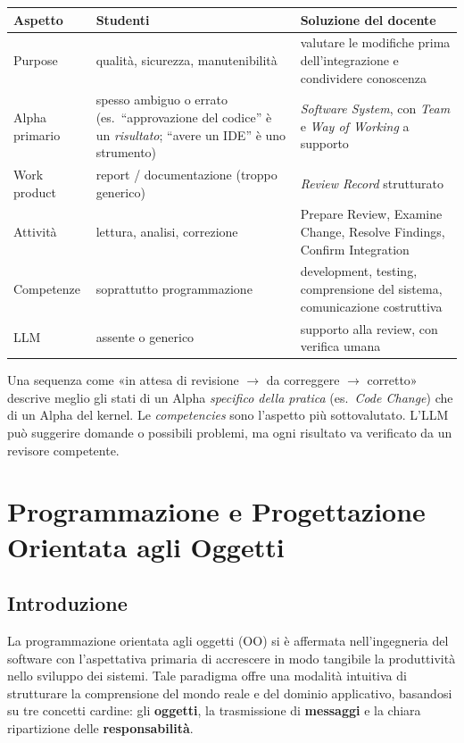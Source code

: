\documentclass[12pt]{extarticle}
\begin{document}
\begin{center}
\small
\begin{tabular}{p{2.4cm}p{4.6cm}p{7.6cm}}
    \toprule
    \textbf{Aspetto} & \textbf{Studenti} & \textbf{Soluzione del docente} \\
    \midrule
    Purpose & qualità, sicurezza, manutenibilità & valutare le modifiche prima dell'integrazione e condividere conoscenza \\
    Alpha primario & spesso ambiguo o errato (es.\ ``approvazione del codice'' è un \emph{risultato}; ``avere un IDE'' è uno strumento) & \textit{Software System}, con \textit{Team} e \textit{Way of Working} a supporto \\
    Work product & report / documentazione (troppo generico) & \textit{Review Record} strutturato \\
    Attività & lettura, analisi, correzione & Prepare Review, Examine Change, Resolve Findings, Confirm Integration \\
    Competenze & soprattutto programmazione & development, testing, comprensione del sistema, comunicazione costruttiva \\
    LLM & assente o generico & supporto alla review, con verifica umana \\
    \bottomrule
\end{tabular}
\end{center}
\noindent Una sequenza come «in attesa di revisione $\to$ da correggere $\to$ corretto» descrive meglio gli stati di un Alpha \emph{specifico della pratica} (es.\ \textit{Code Change}) che di un Alpha del kernel. Le \textit{competencies} sono l'aspetto più sottovalutato. L'LLM può suggerire domande o possibili problemi, ma ogni risultato va verificato da un revisore competente.

\newpage

\section{Programmazione e Progettazione Orientata agli Oggetti}

\subsection{Introduzione}

\noindent La programmazione orientata agli oggetti (OO) si è affermata nell'ingegneria del software con l'aspettativa primaria di accrescere in modo tangibile la produttività nello sviluppo dei sistemi. 
Tale paradigma offre una modalità intuitiva di strutturare la comprensione del mondo reale e del dominio applicativo, basandosi su tre concetti cardine: gli \textbf{oggetti}, la trasmissione di \textbf{messaggi} e la chiara ripartizione delle \textbf{responsabilità}. 
\end{document}

